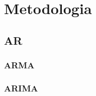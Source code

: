 \chapter{Metodologia}
\label{chap:metodologia}

\section{AR}

\subsection{ARMA}

\subsection{ARIMA}
